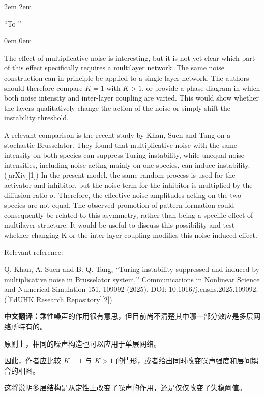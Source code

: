 \documentclass[a4paper,12pt]{article}
\newcommand{\zhtranslationfirst}[1]{%
    \par\medskip\noindent
    {\small\color{blue!60!black}\textbf{中文翻译：}#1}\par
}
\newcommand{\zhtranslation}[1]{%
    \par\smallskip\noindent
    {\small\color{blue!60!black}#1}\par
}
\begin{document}


\leftskip 2em
\rightskip 2em
\medskip

``To ''

\leftskip 0em
\rightskip 0em
\medskip

\newpage
\begin{tcolorbox}[title = {Comment 2 Relation between multiplicative noise and the multilayer structure},fonttitle = \bfseries]
    The effect of multiplicative noise is interesting, but it is not yet clear which part of this effect specifically requires a multilayer network. The same noise construction can in principle be applied to a single-layer network. The authors should therefore compare $K = 1$ with $K > 1$, or provide a phase diagram in which both noise intensity and inter-layer coupling are varied. This would show whether the layers qualitatively change the action of the noise or simply shift the instability threshold.

    \medskip

    A relevant comparison is the recent study by Khan, Suen and Tang on a stochastic Brusselator. They found that multiplicative noise with the same intensity on both species can suppress Turing instability, while unequal noise intensities, including noise acting mainly on one species, can induce instability. ([arXiv][1]) In the present model, the same random process is used for the activator and inhibitor, but the noise term for the inhibitor is multiplied by the diffusion ratio $\sigma$. Therefore, the effective noise amplitudes acting on the two species are not equal. The observed promotion of pattern formation could consequently be related to this asymmetry, rather than being a specific effect of multilayer structure. It would be useful to discuss this possibility and test whether changing K or the inter-layer coupling modifies this noise-induced effect.

    \medskip

    Relevant reference:

    \medskip

    Q. Khan, A. Suen and B. Q. Tang, “Turing instability suppressed and induced by multiplicative noise in Brusselator system,” Communications in Nonlinear Science and Numerical Simulation 151, 109092 (2025), DOI: 10.1016/j.cnsns.2025.109092. ([EdUHK Research Repository][2])
    \zhtranslationfirst{乘性噪声的作用很有意思，但目前尚不清楚其中哪一部分效应是多层网络所特有的。}
    \zhtranslation{原则上，相同的噪声构造也可以应用于单层网络。}
    \zhtranslation{因此，作者应比较 $K = 1$ 与 $K > 1$ 的情形，或者给出同时改变噪声强度和层间耦合的相图。}
    \zhtranslation{这将说明多层结构是从定性上改变了噪声的作用，还是仅仅改变了失稳阈值。}


\end{tcolorbox}
\end{document}
